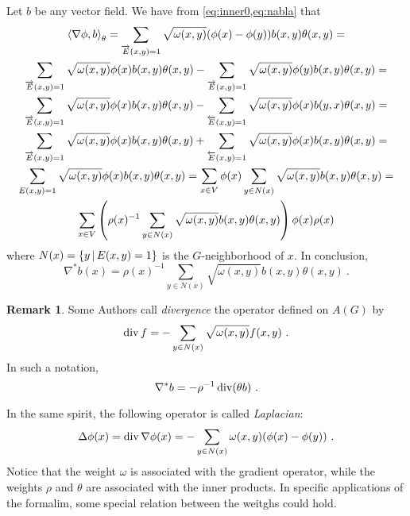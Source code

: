 \documentclass[12pt,a4paper]{amsart}
\theoremstyle{definition}
\newtheorem{remark}{Remark}
\begin{document}
Let $b$ be any vector field. We have from \cref{eq:inner0,eq:nabla} that
\begin{multline*}
  \left\langle\nabla \phi,b\right\rangle_{\theta} = \sum_{\overrightarrow E(x,y)=1}
  \sqrt{\omega(x,y)}  (\phi(x) - \phi(y)) b(x,y) \theta(x,y) = \\
  \sum_{\overrightarrow E(x,y)=1} \sqrt{\omega(x,y)} \phi(x) b(x,y)
  \theta(x,y) - \sum_{\overrightarrow E(x,y)=1}
  \sqrt{\omega(x,y)}  \phi(y) b(x,y) \theta(x,y) = \\
  \sum_{\overrightarrow E(x,y)=1} \sqrt{\omega(x,y)} \phi(x) b(x,y)
  \theta(x,y) - \sum_{\overleftarrow E(x,y)=1}
  \sqrt{\omega(x,y)}  \phi(x) b(y,x) \theta(x,y) = \\
  \sum_{\overrightarrow E(x,y)=1} \sqrt{\omega(x,y)} \phi(x) b(x,y)
  \theta(x,y) + \sum_{\overleftarrow E(x,y)=1}
  \sqrt{\omega(x,y)}  \phi(x) b(x,y) \theta(x,y) = \\
  \sum_{E(x,y)=1} \sqrt{\omega(x,y)}  \phi(x) b(x,y) \theta(x,y) = 
  \sum_{x \in V} \phi(x) \sum_{y \in N(x)}
  \sqrt{\omega(x,y)}  b(x,y) \theta(x,y) = \\
  \sum_{x \in V} \left(\rho(x)^{-1} \sum_{y \in N(x)}
  \sqrt{\omega(x,y)}  b(x,y) \theta(x,y) \right) \phi(x) \rho(x)
\end{multline*}
where $N(x) = \left\{y \, \middle| \, E(x,y)=1 \right\}$ is the $G$-neighborhood of $x$. In
conclusion,
\begin{equation*}
  \nabla^* b(x) = \rho(x)^{-1} \sum_{y \in N(x)}
  \sqrt{\omega(x,y)}  b(x,y) \theta(x,y) \ .
\end{equation*}

\begin{remark}
  Some Authors call \emph{divergence} the operator defined on $A(G)$ by
\begin{equation*}
  \operatorname*{div} f = - \sum_{y \in N(x)} \sqrt{\omega(x,y)} f(x,y) \ .
\end{equation*}
In such a notation,
\begin{equation*}
  \nabla^* b = - \rho^{-1} \Div(\theta b) \ . 
\end{equation*}

In the same spirit, the following operator is called \emph{Laplacian}:
\begin{equation*}
  \Delta \phi (x) = \operatorname*{div} \nabla \phi (x)= - \sum_{y \in N(x)}
  \omega(x,y) (\phi(x)-\phi(y)) \ .
\end{equation*}
Notice that the weight $\omega$ is associated with the gradient
operator, while the weights $\rho$ and $\theta$ are associated with
the inner products. In specific applications of the formalim, some
special relation between the weitghs could hold.
\end{remark}
\end{document}
